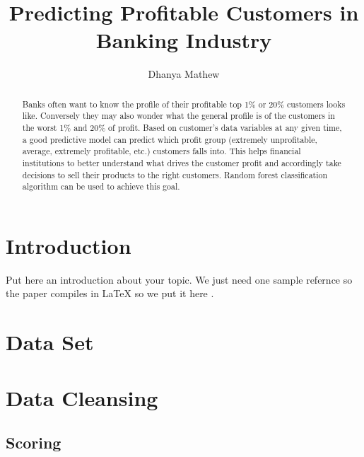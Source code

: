 \documentclass[sigconf]{acmart}
\begin{document}
\title{Predicting Profitable Customers in Banking Industry}


\author{Dhanya Mathew}


\renewcommand{\shortauthors}{G. v. Laszewski}


\begin{abstract}
Banks often want to know the profile of their profitable top 1\% or 20\% customers looks like. Conversely they may also wonder what the general profile is of the customers in the worst 1\% and 20\% of profit. Based on customer’s data variables at any given time, a good predictive model can predict which profit group (extremely unprofitable, average, extremely profitable, etc.) customers falls into. This helps financial institutions to better understand what drives the customer profit and accordingly take decisions to sell their products to the right customers. Random forest classification algorithm can be used to achieve this goal.

\end{abstract}



\maketitle



\section{Introduction}

Put here an introduction about your topic. 
We just need one sample refernce so the paper compiles in LaTeX so we
put it here \cite{editor00}.

\section{Data Set}

\section{Data Cleansing}

\subsection{Scoring}
\end{document}
